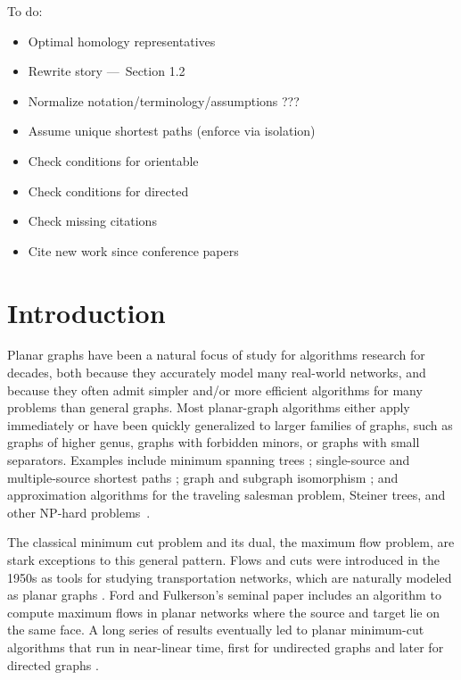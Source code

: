 \documentclass[11pt,twoside]{article}
\begin{document}
\begin{titlepage}
\bigskip
\begin{TODO}\noindent
To do:
\begin{itemize}\itemsep0pt
\item Optimal homology representatives
\item Rewrite story — Section 1.2
\item Normalize notation/terminology/assumptions ???
\item Assume unique shortest paths (enforce via isolation)
\item Check conditions for orientable
\item Check conditions for directed
\item Check missing citations
\item Cite new work since conference papers
\end{itemize}
\end{TODO}

\noindent

\thispagestyle{empty}
\setcounter{page}{0}
\end{titlepage}


\section{Introduction}
\label{sec:intro}

Planar graphs have been a natural focus of study for algorithms research for decades, both because they accurately model many real-world networks, and because they often admit simpler and/or more efficient algorithms for many problems than general graphs.  Most planar-graph algorithms either apply immediately or have been quickly generalized to larger families of graphs, such as graphs of higher genus, graphs with forbidden minors, or graphs with small separators.  Examples include minimum spanning trees \cite{p-omst-99, m-tltam-04}; single-source and multiple-source shortest paths \cite{cc-msspg-07, fr-pgnwe-06, hkrs-fspap-97, k-msspp-05, kmw-spdpg-09, lrt-gnd-79, tm-spltm-09}; graph and subgraph isomorphism \cite{g-itegd-00, hw-ltaip-74, m-itgbg-80, e-sipgr-99, e-dtmcg-00}; and approximation algorithms for the traveling salesman problem, Steiner trees, and other NP-hard problems~\cite{bdt-ptass-08, bkk-ptass-07, bkk-stpg-07, dhm-aacd-07, e-dtmcg-00}.

The classical minimum cut problem and its dual, the maximum flow problem, are stark exceptions to this general pattern.  Flows and cuts were introduced in the 1950s as tools for studying transportation networks, which are naturally modeled as planar graphs \cite{hr-fmern-55}.  Ford and Fulkerson's seminal paper \cite{ff-mfn-56} includes an algorithm to compute maximum flows in planar networks where the source and target lie on the same face.  A long series of results eventually led to planar minimum-cut algorithms that run in near-linear time, first for undirected graphs \cite{r-mstcp-83, hj-oamfu-85, f-faspp-87, insw-iamcmf-11} and later for directed graphs \cite{jk-mcdpn-92, hkrs-fspap-97, mnnw-mdpgo-15}.
\end{document}
